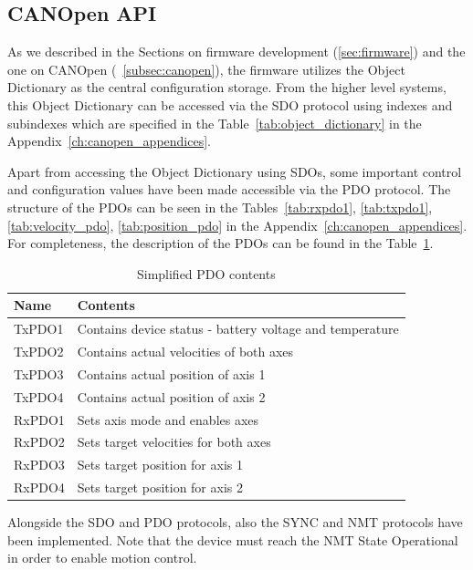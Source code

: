 \subsection{CANOpen API}
As we described in the Sections on firmware development (\ref{sec:firmware}) and the one on CANOpen (~\ref{subsec:canopen}), the firmware utilizes the Object Dictionary as the central configuration storage.
From the higher level systems, this Object Dictionary can be accessed via the SDO protocol using indexes and subindexes which are specified in the Table~\ref{tab:object_dictionary} in the Appendix~\ref{ch:canopen_appendices}.

Apart from accessing the Object Dictionary using SDOs, some important control and configuration values have been made accessible via the PDO protocol.
The structure of the PDOs can be seen in the Tables~\ref{tab:rxpdo1}, \ref{tab:txpdo1}, \ref{tab:velocity_pdo}, \ref{tab:position_pdo} in the Appendix~\ref{ch:canopen_appendices}.
For completeness, the description of the PDOs can be found in the Table~\ref{tab:pdo_meaning}.

\begin{table}[H]
    \centering
    \begin{tabular}{ |p{3cm}|p{10cm}| }
        \hline
        Name & Contents \\
        \hline
        \hline
        TxPDO1 & Contains device status - battery voltage and temperature \\
        \hline
        TxPDO2 & Contains actual velocities of both axes \\
        \hline
        TxPDO3 & Contains actual position of axis 1 \\
        \hline
        TxPDO4 & Contains actual position of axis 2 \\
        \hline
        RxPDO1 & Sets axis mode and enables axes \\
        \hline
        RxPDO2 & Sets target velocities for both axes \\
        \hline
        RxPDO3 & Sets target position for axis 1 \\
        \hline
        RxPDO4 & Sets target position for axis 2 \\
        \hline
    \end{tabular}
    \caption{Simplified PDO contents}
    \label{tab:pdo_meaning}
\end{table}

Alongside the SDO and PDO protocols, also the SYNC and NMT protocols have been implemented.
Note that the device must reach the NMT State Operational in order to enable motion control.

